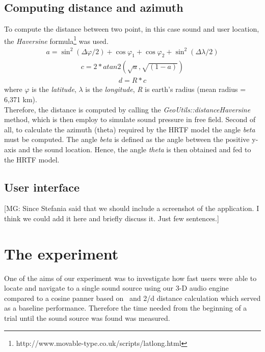 \documentclass[journal]{IEEEtran}
\begin{document}
\subsection{Computing distance and azimuth}
To compute the distance between two point, in this case sound and user location, the \textit{Haversine} formula\footnote{http://www.movable-type.co.uk/scripts/latlong.html} was used.
\begin{equation}\label{eq:distancehaversine1}
\begin{split}
  a = {\sin}^{2}(\Delta\varphi / 2) + \cos \varphi _1 + \cos \varphi _2 + \sin^2(\Delta\lambda / 2)
\end{split}
\end{equation}
\begin{equation}\label{eq:distancehaversine2}
\begin{split}
  c = 2 * atan2(\sqrt{a},\sqrt{(1-a)}) 
\end{split}
\end{equation}
\begin{equation}\label{eq:distancehaversine3}
\begin{split}
  d = R * c
\end{split}
\end{equation}
where $\varphi$ is the \emph{latitude}, $\lambda$ is the \emph{longitude}, \emph{R} is earth's radius (mean radius = 6,371 km). \\
Therefore, the distance is computed by calling the \emph{GeoUtils::distanceHaversine} method, which is then employ to simulate sound pressure in free field. Second of all, to calculate the azimuth (theta) required by the HRTF model the angle \textit{beta} must be computed. The angle \textit{beta} is defined as the angle between the positive y-axis and the sound location. Hence, the angle \textit{theta} is then obtained and fed to the HRTF model.

\subsection{User interface}
[MG: Since Stefania said that we should include a screenshot of the application. I think we could add it here and briefly discuss it. Just few sentences.]

\section{The experiment}
One of the aims of our experiment was to investigate how fast users were able to locate and navigate to a single sound source using our 3-D audio engine compared to a cosine panner based on~\cite{AndyFarnell2010} and 2/d distance calculation which served as a baseline performance. Therefore the time needed from the beginning of a trial until the sound source was found was measured. 
\end{document}
